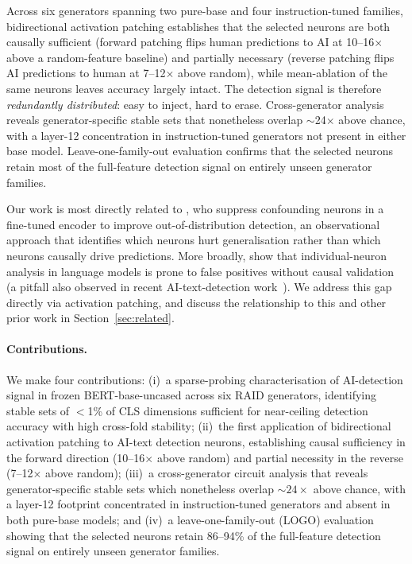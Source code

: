 \documentclass[11pt]{article}
\newcommand{\bertbase}{BERT-base-uncased\xspace}
\begin{document}
Across six generators spanning two pure-base and four instruction-tuned families, bidirectional activation patching establishes that the selected neurons are both causally sufficient (forward patching flips human predictions to AI at 10--16$\times$ above a random-feature baseline) and partially necessary (reverse patching flips AI predictions to human at 7--12$\times$ above random), while mean-ablation of the same neurons leaves accuracy largely intact. The detection signal is therefore \textit{redundantly distributed}: easy to inject, hard to erase. Cross-generator analysis reveals generator-specific stable sets that nonetheless overlap $\sim$24$\times$ above chance, with a layer-12 concentration in instruction-tuned generators not present in either base model. Leave-one-family-out evaluation confirms that the selected neurons retain most of the full-feature detection signal on entirely unseen generator families.

Our work is most directly related to \citet{borile2025confounding}, who suppress confounding neurons in a fine-tuned encoder to improve out-of-distribution detection, an observational approach that identifies which neurons hurt generalisation rather than which neurons causally drive predictions. More broadly, \citet{antverg2022pitfalls} show that individual-neuron analysis in language models is prone to false positives without causal validation (a pitfall also observed in recent AI-text-detection work~\citep{enkhbayar2025atomic}). We address this gap directly via activation patching, and discuss the relationship to this and other prior work in Section~\ref{sec:related}.

\paragraph{Contributions.}
We make four contributions: (i)~a sparse-probing characterisation of AI-detection signal in frozen \bertbase across six RAID generators, identifying stable sets of $<$1\% of CLS dimensions sufficient for near-ceiling detection accuracy with high cross-fold stability; (ii)~the first application of bidirectional activation patching to AI-text detection neurons, establishing causal sufficiency in the forward direction (10--16$\times$ above random) and partial necessity in the reverse (7--12$\times$ above random); (iii)~a cross-generator circuit analysis that reveals generator-specific stable sets which nonetheless overlap ${\sim}24\times$ above chance, with a layer-12 footprint concentrated in instruction-tuned generators and absent in both pure-base models; and (iv)~a leave-one-family-out (LOGO) evaluation showing that the selected neurons retain 86--94\% of the full-feature detection signal on entirely unseen generator families.
\end{document}

